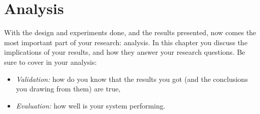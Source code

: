 \chapter{Analysis}%
\label{ch:analysis}
With the design and experiments done, and the results presented, now comes the most important part of your research: analysis.
In this chapter you discuss the implications of your results, and how they answer your research questions.
Be sure to cover in your analysis:
\begin{itemize}
    \item \emph{Validation:} how do you know that the results you got (and the conclusions you drawing from them) are true,
    \item \emph{Evaluation:} how well is your system performing.
\end{itemize}